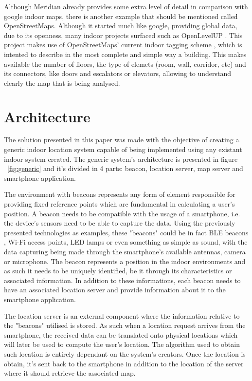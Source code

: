 \documentclass[a4paper]{IEEEtran}
\begin{document}
Although Meridian already provides some extra level of detail in comparison with google indoor maps, there is another example that should be mentioned called OpenStreetMaps. Although it started much like google, providing global data, due to its openness, many indoor projects surfaced such as OpenLevelUP \cite{openlevel}. This project makes use of OpenStreetMaps' current indoor tagging scheme \cite{opentagging}, which is intented to describe in the most complete and simple way a building. This makes available the number of floors, the type of elemets (room, wall, corridor, etc) and its connectors, like doors and escalators or elevators, allowing to understand clearly the map that is being analysed.

\section{Architecture}
\label{sec:architecture}

The solution presented in this paper was made with the objective of creating a generic indoor location system capable of being implemented using any existant indoor system created. The generic system's architecture is presented in figure ~\ref{fig:generic} and it's divided in 4 parts: beacon, location server, map server and smartphone application. 

The environment with beacons represents any form of element responsible for providing fixed reference points which are fundamental in calculating a user's position. A beacon needs to be compatible with the usage of a smartphone, i.e. the device's sensors need to be able to capture the data. Using the previously presented technologies as examples, these "beacons" could be in fact BLE beacons , Wi-Fi access points, LED lamps or even something as simple as sound, with the data capturing being made through the smartphone's available antennas, camera or microphone. The beacon represents a position in the indoor environments and as such it needs to be uniquely identified, be it through its characteristics or associated information. In addition to these informations, each beacon needs to have an associated location server and provide information about it to the smartphone application.

The location server is an external component where the information relative to the "beacons" utilised is stored. As such when a location request arrives from the smartphone, the received data can be translated onto physical locations which will later be used to compute the user's location. The algorithm used to obtain such location is entirely dependant on the system's creators. Once the location is obtain, it's sent back to the smartphone in addition to the location of the server where it should retrieve the associated map.
\end{document}
